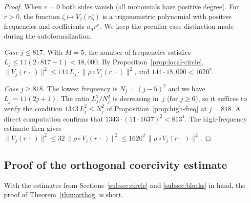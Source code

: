 \documentclass[11pt]{amsart}
\theoremstyle{remark}
\begin{document}
\begin{proof}
When $r = 0$ both sides vanish (all monomials have positive degree).
For $r > 0$, the function $\zeta \mapsto V_j(r\zeta)$ is a trigonometric
polynomial with positive frequencies and coefficients $a_n r^n$. We keep the peculiar case distinction made during the autoformalization.
 \vspace{0.7em}

\noindent
\emph{Case $j \le 817$.}\;
With $M = 5$, the number of frequencies satisfies $L_j \le 11(2 \cdot 817 + 1)
< 18{,}000$.  By Proposition~\ref{prop:local-circle},
$\lVert V_j(r\,\cdot\,) \rVert^2 \le 144\, L_j \cdot
\lVert \rho \circ V_j(r\,\cdot\,) \rVert^2$, and
$144 \cdot 18{,}000 < 1620^2$.
 \vspace{0.7em}

\noindent
\emph{Case $j \ge 818$.}\;
The lowest frequency is $N_j = (j{-}5)^2$ and we have
$L_j = 11(2j{+}1)$.  The ratio $L_j^2/N_j^2$ is decreasing in~$j$
(for $j \ge 6$), so it suffices to verify the condition
$1343\,L_j^2 \le N_j^2$ of Proposition~\ref{prop:high-freq} at $j = 818$.
A direct computation confirms that $1343 \cdot (11 \cdot 1637)^2 < 813^4$.
The high-frequency estimate then gives
$\lVert V_j(r\,\cdot\,) \rVert^2 \le 32\,\lVert \rho \circ V_j(r\,\cdot\,) \rVert^2
\le 1620^2\,\lVert \rho \circ V_j(r\,\cdot\,) \rVert^2$.
\end{proof} 
\subsection{Proof of the orthogonal coercivity estimate}\label{subsec:assembly} With the estimates from Sections~\ref{subsec:circle} and \ref{subsec:blocks} in hand, the proof of
Theorem~\ref{thm:orthog} is short.
\end{document}
